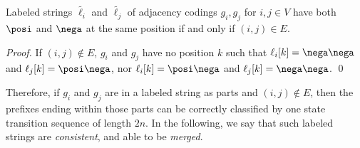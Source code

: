 \begin{lemma}
Labeled strings $\tilde{\ell_i}$ and $\tilde{\ell_j}$ of adjacency codings $g_i, g_j$ for $i, j \in V$ have both $\posi$ and $\nega$ at the same position if and only if $(i,j) \in E$. 
\label{lem:joint2}
\end{lemma}
\begin{proof}
\newcommand{\set}[1]{\{#1\}}
%
If $(i,j) \notin E$, $g_i$ and $g_j$ have no position $k$ such that $\ell_i[k]=\nega\nega$ and $\ell_j[k]=\posi\nega$, nor $\ell_i[k]=\posi\nega$ and $\ell_j[k]=\nega\nega$.
\qed
\end{proof}
%
Therefore, if $g_i$ and $g_j$ are in a labeled string as parts and $(i,j) \not\in E$, then the prefixes ending within those parts can be correctly classified by one state transition sequence of length $2n$. 
In the following, we say that such labeled strings are {\em consistent}, and able to be {\em merged}. 

